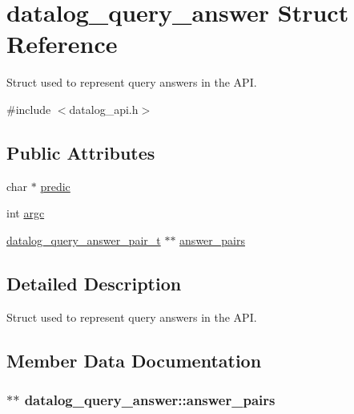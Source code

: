 \hypertarget{structdatalog__query__answer}{}\section{datalog\+\_\+query\+\_\+answer Struct Reference}
\label{structdatalog__query__answer}


Struct used to represent query answers in the A\+PI.  




{\ttfamily \#include $<$datalog\+\_\+api.\+h$>$}

\subsection*{Public Attributes}
\begin{DoxyCompactItemize}
\item 
char $\ast$ \hyperlink{structdatalog__query__answer_a721776aabf590192c96df972333d38d4}{predic}
\item 
int \hyperlink{structdatalog__query__answer_a29951460bcc8f936f7f349c851ba3819}{argc}
\item 
\hyperlink{datalog__api_8h_a734a9da1b36a22c0f4477a4bbceddb91}{datalog\+\_\+query\+\_\+answer\+\_\+pair\+\_\+t} $\ast$$\ast$ \hyperlink{structdatalog__query__answer_a65100b17d9f772d15161d810e6a43aa6}{answer\+\_\+pairs}
\end{DoxyCompactItemize}


\subsection{Detailed Description}
Struct used to represent query answers in the A\+PI. 

\subsection{Member Data Documentation}
\subsubsection[{\texorpdfstring{answer\+\_\+pairs}{answer_pairs}}]{$\ast$$\ast$ datalog\+\_\+query\+\_\+answer\+::answer\+\_\+pairs}\hypertarget{structdatalog__query__answer_a65100b17d9f772d15161d810e6a43aa6}{}\label{structdatalog__query__answer_a65100b17d9f772d15161d810e6a43aa6}
